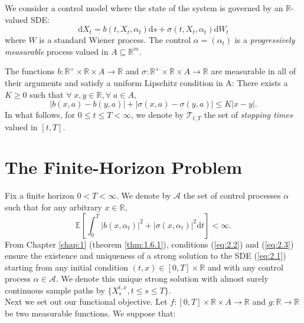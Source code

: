 \begin{definition}
    We consider a control model where the state of the system is governed by 
    an $\mathbb{R}$-valued SDE:
    \begin{equation}\label{eq:2.1}
        \mathrm dX_t=b(t,X_t,\alpha_t)\mathrm ds+\sigma(t,X_t,\alpha_t)\mathrm dW_t
    \end{equation}
    where $W$ is a standard Wiener process. The control $\alpha=(\alpha_t)$ is a 
    \emph{progressively measurable} process valued in $A\subseteq\mathbb{R}^m$.
\end{definition}

The functions $b:\mathbb{R}^+\times\mathbb{R}\times A\rightarrow\mathbb{R}$
and $\sigma:\mathbb{R}^+\times\mathbb{R}\times A\rightarrow\mathbb{R}$ are measurable
in all of their arguments and satisfy a uniform Lipschitz condition in A:
There exists a $K\geq0$ such that $\forall\;x,y\in\mathbb{R}, \forall\;a\in A,$
\begin{equation}\label{eq:2.2}
    |b(x,a)-b(y,a)|+|\sigma(x,a)-\sigma(y,a)|\leq K|x-y|.
\end{equation}
In what follows, for $0\leq t\leq T<\infty$, we denote by $\mathcal{T}_{t,T}$ the
set of \emph{stopping times} valued in $[t,T]$.

\section{The Finite-Horizon Problem}\label{sec:2.3}

Fix a finite horizon $0<T<\infty$. We denote by $\mathcal{A}$ the set of control
processes $\alpha$ such that for any arbitrary $x\in\mathbb{R},$
\begin{equation}\label{eq:2.3}
    \mathbb{E}\left[\int_0^T|b(x,\alpha_t)|^2+|\sigma(x,\alpha_t)|^2\mathrm dt\right]<\infty.
\end{equation}
From Chapter \ref{chap:1} (theorem \ref{thm:1.6.1}), conditions (\ref{eq:2.2}) and (\ref{eq:2.3}) ensure the existence
and uniqueness of a strong solution to the SDE (\ref{eq:2.1}) starting from any initial
condition $(t,x)\in[0,T]\times\mathbb{R}$ and with any control process $\alpha\in\mathcal{A}$.
We denote this unique strong solution with almost surely continuous sample paths by 
$\{X_s^{t,x},t\leq s\leq T\}$.\\
Next we set out our functional objective. Let $f:[0,T]\times\mathbb{R}\times A\rightarrow\mathbb{R}$
and $g:\mathbb{R}\rightarrow\mathbb{R}$ be two measurable functions. We suppose that:

